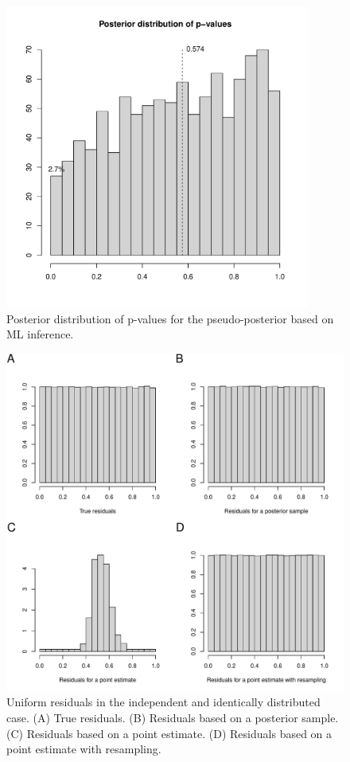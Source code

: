 \documentclass{article}
\begin{document}
\begin{figure}[t!]
\begin{center}
\includegraphics[width=10cm]{exampleMLSup.pdf}
\end{center}
\caption{Posterior distribution of p-values for the pseudo-posterior based on ML inference.
\label{fig:exampleMLSup}}
\end{figure}


\begin{figure}[t!]
\begin{center}
\includegraphics[width=15cm]{iid.pdf}
\end{center}
\caption{Uniform residuals in the independent and identically distributed case. 
(A) True residuals. (B) Residuals based on a posterior sample.
(C) Residuals based on a point estimate.
(D) Residuals based on a point estimate with resampling.
\label{fig:iid}}
\end{figure}
\end{document}
